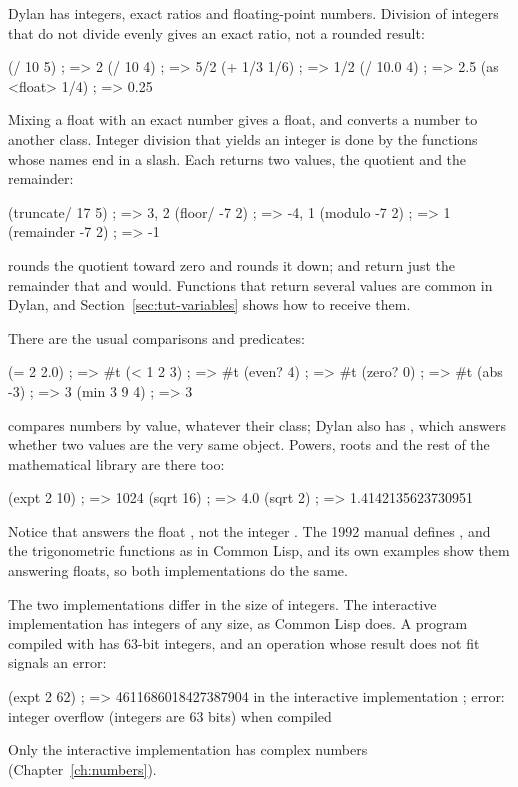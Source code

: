Dylan has integers, exact ratios and floating-point numbers. Division of
integers that do not divide evenly gives an exact ratio, not a rounded
result:

\begin{dylan}
(/ 10 5)      ; => 2
(/ 10 4)      ; => 5/2
(+ 1/3 1/6)   ; => 1/2
(/ 10.0 4)    ; => 2.5
(as <float> 1/4)  ; => 0.25
\end{dylan}

Mixing a float with an exact number gives a float, and  converts a
number to another class. Integer division that yields an integer is done
by the functions whose names end in a slash. Each returns two values, the
quotient and the remainder:

\begin{dylan}
(truncate/ 17 5)   ; => 3, 2
(floor/ -7 2)      ; => -4, 1
(modulo -7 2)      ; => 1
(remainder -7 2)   ; => -1
\end{dylan}

 rounds the quotient toward zero and  rounds
it down;  and  return just the remainder that
 and  would. Functions that return several
values are common in Dylan, and Section~\ref{sec:tut-variables} shows how
to receive them.

There are the usual comparisons and predicates:

\begin{dylan}
(= 2 2.0)     ; => #t
(< 1 2 3)     ; => #t
(even? 4)     ; => #t
(zero? 0)     ; => #t
(abs -3)      ; => 3
(min 3 9 4)   ; => 3
\end{dylan}

\code{=} compares numbers by value, whatever their class; Dylan also has
, which answers whether two values are the very same object.
Powers, roots and the rest of the mathematical library are there too:

\begin{dylan}
(expt 2 10)   ; => 1024
(sqrt 16)     ; => 4.0
(sqrt 2)      ; => 1.4142135623730951
\end{dylan}

Notice that  answers the float , not the integer
. The 1992 manual defines ,  and the
trigonometric functions as in Common Lisp, and its own examples show them
answering floats, so both implementations do the same.

\begin{warnbox}
The two implementations differ in the size of integers. The interactive
implementation has integers of any size, as Common Lisp does. A program
compiled with  has 63-bit integers, and an operation whose
result does not fit signals an error:
\begin{dylan}
(expt 2 62)   ; => 4611686018427387904 in the interactive implementation
              ; error: integer overflow (integers are 63 bits) when compiled
\end{dylan}
Only the interactive implementation has complex numbers
(Chapter~\ref{ch:numbers}).
\end{warnbox}

